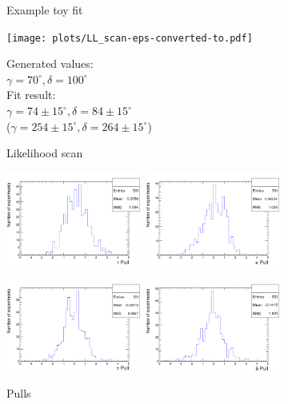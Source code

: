 \begin{figure}[hp]
		\caption{Example toy fit} 		
	\end{figure}				


	\begin{figure}[hp]
	\centering
		
		
		\texttt{[image: plots/LL\_scan-eps-converted-to.pdf]} 
		
		Generated values: \\  $\gamma = 70^{\circ}, \delta = 100^{\circ}$ \\
		Fit result:    \\ $\gamma = 74 \pm 15^{\circ}, \delta = 84 \pm 15^{\circ}$ \\
		 ($\gamma = 254 \pm 15^{\circ}, \delta = 264 \pm 15^{\circ}$)

		\caption{Likelihood scan} 		

	\end{figure}	


	\begin{figure}[hp]
	\centering
		\includegraphics[width=0.4\textwidth, height = 3.cm]{figs/plots_toy/r_pull-eps-converted-to.pdf} 
		\includegraphics[width=0.4\textwidth, height = 3.cm]{figs/plots_toy/k_pull-eps-converted-to.pdf} 
		
		\includegraphics[width=0.4\textwidth, height = 3.cm]{figs/plots_toy/gamma_pull-eps-converted-to.pdf} 
		\includegraphics[width=0.4\textwidth, height = 3.cm]{figs/plots_toy/delta_pull-eps-converted-to.pdf} 

		\caption{Pulls} 		

	\end{figure}	
	

